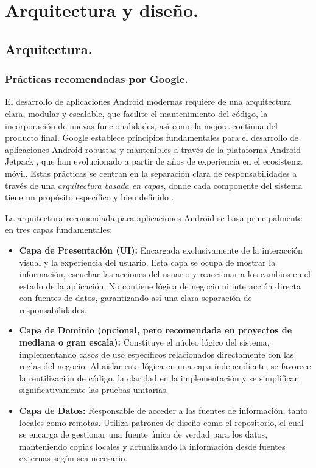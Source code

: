 \section{Arquitectura y diseño.}
\label{sec:arquitectura_y_diseno}

\subsection{Arquitectura.}

\subsubsection{Prácticas recomendadas por Google.}

El desarrollo de aplicaciones Android modernas requiere de una arquitectura clara, modular y escalable, que facilite el mantenimiento del código, la incorporación de nuevas funcionalidades, así como la mejora continua del producto final. Google establece principios fundamentales para el desarrollo de aplicaciones Android robustas y mantenibles a través de la plataforma Android Jetpack \cite{Jetpack}, que han evolucionado a partir de años de experiencia en el ecosistema móvil. Estas prácticas se centran en la separación clara de responsabilidades a través de una \textit{arquitectura basada en capas}, donde cada componente del sistema tiene un propósito específico y bien definido \cite{AndroidBestPractices}. 

La arquitectura recomendada para aplicaciones Android se basa principalmente en tres capas fundamentales:


\begin{itemize}
  \item \textbf{Capa de Presentación (UI):} Encargada exclusivamente de la interacción visual y la experiencia del usuario. Esta capa se ocupa de mostrar la información, escuchar las acciones del usuario y reaccionar a los cambios en el estado de la aplicación. No contiene lógica de negocio ni interacción directa con fuentes de datos, garantizando así una clara separación de responsabilidades.

  \item \textbf{Capa de Dominio (opcional, pero recomendada en proyectos de mediana o gran escala):} Constituye el núcleo lógico del sistema, implementando casos de uso específicos relacionados directamente con las reglas del negocio. Al aislar esta lógica en una capa independiente, se favorece la reutilización de código, la claridad en la implementación y se simplifican significativamente las pruebas unitarias.

  \item \textbf{Capa de Datos:} Responsable de acceder a las fuentes de información, tanto locales como remotas. Utiliza patrones de diseño como el repositorio, el cual se encarga de gestionar una fuente única de verdad para los datos, manteniendo copias locales y actualizando la información desde fuentes externas según sea necesario.
\end{itemize}

